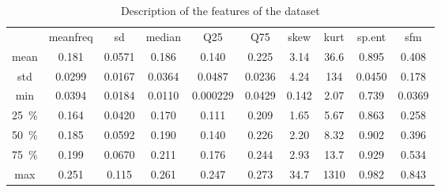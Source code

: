 \begin{table}[htb]
	\caption{Description of the features of the dataset}
	 \begin{subtable}{\textwidth}
			\centering
			\begin{tabular}{@{} c c c c  c c c c c c @{}}\toprule
				& meanfreq & sd & median & Q25 & Q75 & skew & kurt & sp.ent & sfm \\
			mean & \num{0.181} &\num{0.0571} & \num{0.186} & \num{0.140} & \num{0.225} & \num{3.14} &\num{36.6} & \num{0.895} &	\num{0.408} \\
			std & \num{0.0299} & \num{0.0167} & \num{0.0364} & \num{0.0487} & \num{0.0236} & \num{4.24} & \num{134} & \num{0.0450} & \num{0.178} \\
			min & \num{0.0394} & \num{0.0184} & \num{0.0110} & \num{0.000229} & \num{0.0429} & \num{0.142} & \num{2.07} & \num{0.739} & \num{0.0369} \\
			\SI{25}{\percent} & \num{0.164} & \num{0.0420} & \num{0.170} & \num{0.111} & \num{0.209} & \num{1.65} & \num{5.67} & \num{0.863} & \num{0.258} \\
			\SI{50}{\percent} & \num{0.185} & \num{0.0592} & \num{0.190} & \num{0.140} & \num{0.226} & \num{2.20} & \num{8.32} & \num{0.902} & \num{0.396} \\
			\SI{75}{\percent} & \num{0.199} & \num{0.0670} & \num{0.211}  & \num{0.176} & \num{0.244} & \num{2.93} & \num{13.7} & \num{0.929} & \num{0.534} \\
			max & \num{0.251} & \num{0.115} & \num{0.261} & \num{0.247} &
			\num{0.273} & \num{34.7} & \num{1310} & \num{0.982} & \num{0.843} \\ \bottomrule
			\end{tabular}
		\end{subtable}\hfill\null%


\end{table}
